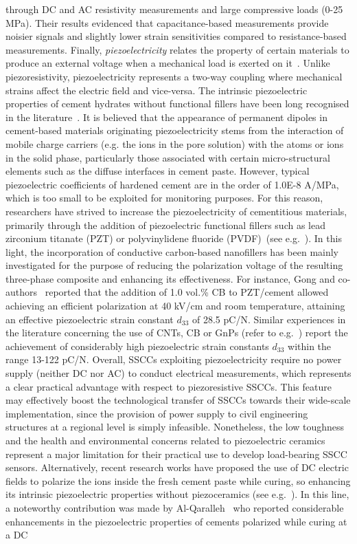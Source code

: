 \documentclass[a4paper,fleqn]{cas-sc}
\begin{document}
through DC and AC resistivity measurements and large compressive loads (0-25 MPa). Their results evidenced that capacitance-based measurements provide noisier signals and slightly lower strain sensitivities compared to resistance-based measurements. Finally, \textit{piezoelectricity} relates the property of certain materials to produce an external voltage when a mechanical load is exerted on it~\cite{Elahi2018}. Unlike piezoresistivity, piezoelectricity represents a two-way coupling where mechanical strains affect the electric field and vice-versa. The intrinsic piezoelectric properties of cement hydrates without functional fillers have been long recognised in the literature~\cite{Sun2004,Shi2018}. It is believed that the appearance of permanent dipoles in cement-based materials originating piezoelectricity stems from the interaction of mobile charge carriers (e.g. the ions in the pore solution) with the atoms or ions in the solid phase, particularly those associated with certain micro-structural elements such as the diffuse interfaces in cement paste. However, typical piezoelectric coefficients of hardened cement are in the order of 1.0E-8 A/MPa, which is too small to be exploited for monitoring purposes. For this reason, researchers have strived to increase the piezoelectricity of cementitious materials, primarily through the addition of piezoelectric functional fillers such as lead zirconium titanate (PZT) or polyvinylidene fluoride (PVDF)~(see e.g.~\cite{Jaitanong2014,Xu2022}). In this light, the incorporation of conductive carbon-based nanofillers has been mainly investigated for the purpose of reducing the polarization voltage of the resulting three-phase composite and enhancing its effectiveness. For instance, Gong and co-authors~\cite{Gong2010} reported that the addition of 1.0 vol.\% CB to PZT/cement allowed achieving an efficient polarization at 40 kV/cm and room temperature, attaining an effective piezoelectric strain constant $d_{33}$ of 28.5 pC/N. Similar experiences in the literature concerning the use of CNTs, CB or GnPs (refer to e.g.~\cite{Huang2009,Potong2017,Jaitanong2018}) report the achievement of considerably high piezoelectric strain constants $d_{33}$ within the range 13-122 pC/N. Overall, SSCCs exploiting piezoelectricity require no power supply (neither DC nor AC) to conduct electrical measurements, which represents a clear practical advantage with respect to piezoresistive SSCCs. This feature may effectively boost the technological transfer of SSCCs towards their wide-scale implementation, since the provision of power supply to civil engineering structures at a regional level is simply infeasible. Nonetheless, the low toughness and the health and environmental concerns related to piezoelectric ceramics represent a major limitation for their practical use to develop load-bearing SSCC sensors. Alternatively, recent research works have proposed the use of DC electric fields to polarize the ions inside the fresh cement paste while curing, so enhancing its intrinsic piezoelectric properties without piezoceramics (see e.g.~\cite{Dong2007,Yaphary2016}). In this line, a noteworthy contribution was made by Al-Qaralleh~\cite{AlQaralleh2022} who reported considerable enhancements in the piezoelectric properties of cements polarized while curing at a DC 
\end{document}

